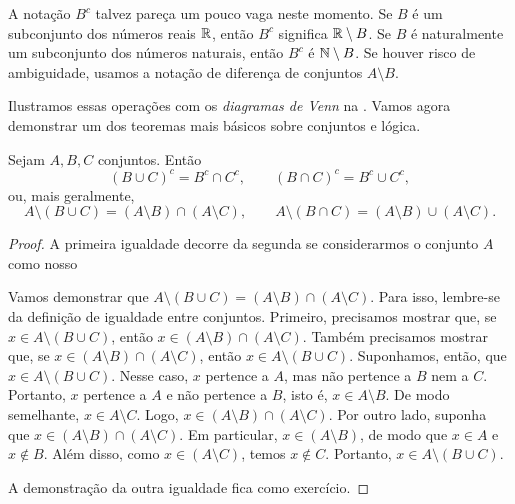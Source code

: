 A notação $B^c$ talvez pareça um pouco vaga neste momento. Se $B$ é um
subconjunto dos números reais ${\mathbb{R}}$, então $B^c$ significa
${\mathbb{R}} \setminus B$. Se $B$ é naturalmente um subconjunto dos números naturais,
então $B^c$ é ${\mathbb{N}} \setminus B$. Se houver risco de ambiguidade, usamos a
notação de diferença de conjuntos $A \setminus B$.

\begin{myfigureht}
\caption{Diagramas de Venn das operações com conjuntos; a região sombreada
representa o resultado da operação.\label{figsetop}}
\end{myfigureht}
Ilustramos essas operações com os
\emph{diagramas de Venn} na .
Vamos agora demonstrar um dos teoremas mais básicos sobre conjuntos e lógica.

\begin{thm}[De Morgan]
Sejam $A, B, C$ conjuntos. Então
\begin{equation*}
{(B \cup C)}^c = B^c \cap C^c , \qquad
{(B \cap C)}^c = B^c \cup C^c ,
\end{equation*}
ou, mais geralmente,
\begin{equation*}
A \setminus (B \cup C) = (A \setminus B) \cap (A \setminus C) , 
\qquad
A \setminus (B \cap C) = (A \setminus B) \cup (A \setminus C) .
\end{equation*}
\end{thm}

\begin{proof}
A primeira igualdade decorre da segunda se considerarmos o conjunto $A$ como
nosso 

Vamos demonstrar que
$A \setminus (B \cup C) = (A \setminus B) \cap (A \setminus C)$.
Para isso, lembre-se da definição de igualdade entre conjuntos. Primeiro,
precisamos mostrar que, se $x \in A \setminus (B \cup C)$, então
$x \in (A \setminus B) \cap (A \setminus C)$. Também precisamos mostrar que,
se $x \in (A \setminus B) \cap (A \setminus C)$, então
$x \in A \setminus (B \cup C)$.
Suponhamos, então, que $x \in A \setminus (B \cup C)$. Nesse caso, $x$
pertence a $A$, mas não pertence a $B$ nem a $C$. Portanto, $x$ pertence a
$A$ e não pertence a $B$, isto é, $x \in A \setminus B$. De modo semelhante,
$x \in A \setminus C$. Logo,
$x \in (A \setminus B) \cap (A \setminus C)$.
Por outro lado, suponha que
$x \in (A \setminus B) \cap (A \setminus C)$. Em particular,
$x \in (A \setminus B)$, de modo que $x \in A$ e $x \notin B$. Além disso, como
$x \in (A \setminus C)$, temos $x \notin C$.
Portanto, $x \in A \setminus (B \cup C)$.

A demonstração da outra igualdade fica como exercício.
\end{proof}

